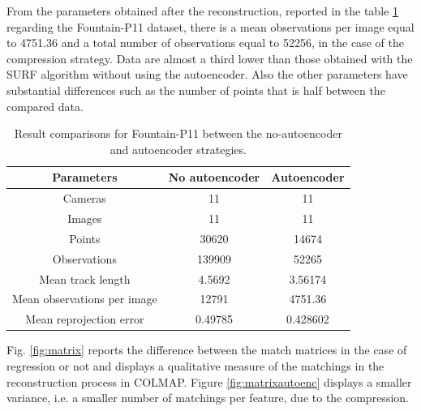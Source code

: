 From the parameters obtained after the reconstruction, reported in the table \ref{table:result} regarding the Fountain-P11 dataset, there is a mean observations per image equal to 4751.36 and a total number of observations equal to 52256, in the case of the compression strategy. Data are almost a third lower than those obtained with the SURF algorithm without using the autoencoder. Also the other parameters have substantial differences such as the number of points that is half between the compared data.

\begin{table}[h!]
\centering
\begin{tabular}{ |c|c|c| } 
\hline
\textbf{Parameters} & \textbf{No autoencoder} & \textbf{Autoencoder} \\ [0.5ex]
\hline
 Cameras & 11 & 11 \\ [0.5ex]
 Images & 11 & 11 \\ [0.5ex]
 Points & 30620 & 14674 \\ [0.5ex]
 Observations & 139909 & 52265 \\ [0.5ex]
 Mean track length & 4.5692 & 3.56174 \\ [0.5ex]
 Mean observations per image & 12791 & 4751.36 \\ [0.5ex]
 Mean reprojection error & 0.49785 & 0.428602 \\ [0.5ex]
 \hline
\end{tabular}
 \caption{\centering Result comparisons for Fountain-P11 between the no-autoencoder and autoencoder strategies.}
 \label{table:result}
\end{table}

Fig. \ref{fig:matrix} reports the difference between the match matrices in the case of regression or not and displays a qualitative measure of the matchings in the reconstruction process in COLMAP. Figure \ref{fig:matrixautoenc} displays a smaller variance, i.e. a smaller number of matchings per feature, due to the compression.

